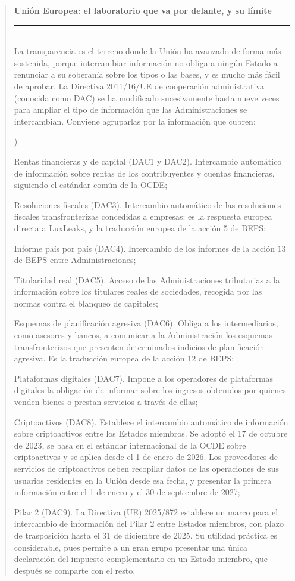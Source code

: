 \documentclass[10pt,a4paper]{article}
\newcounter{alphaitem}
\newenvironment{la}
      {\begin{list}{\alph{alphaitem})}{%
          \usecounter{alphaitem}%
          \setlength{\leftmargin}{1cm}%
          \setlength{\parskip}{3pt}%
          \setlength{\itemsep}{0pt}%
          \setlength{\parsep}{0pt}%
      }}
      {\end{list}}
\newenvironment{specialblock}[1]{%
      \begin{quote} %
      \small %
      \noindent\textbf{#1}\\[-0.3em] %
      \rule{\linewidth}{0.4pt}\\[0.6em]}{
      \end{quote}}
\begin{document}
\begin{specialblock}{\textbf{Unión Europea}: el laboratorio que va por delante, y su límite}
    La transparencia es el terreno donde la Unión ha avanzado de forma más sostenida, porque intercambiar información no obliga a ningún Estado a renunciar a su soberanía sobre los tipos o las bases, y es mucho más fácil de aprobar. La Directiva 2011/16/UE de cooperación administrativa (conocida como DAC) se ha modificado sucesivamente hasta nueve veces para ampliar el tipo de información que las Administraciones se intercambian. Conviene agruparlas por la información que cubren:
    \begin{la}
        \item Rentas financieras y de capital (DAC1 y DAC2). Intercambio automático de información sobre rentas de los contribuyentes y cuentas financieras, siguiendo el estándar común de la OCDE;
        \item Resoluciones fiscales (DAC3). Intercambio automático de las resoluciones fiscales transfronterizas concedidas a empresas: es la respuesta europea directa a LuxLeaks, y la traducción europea de la acción 5 de BEPS;
        \item Informe país por país (DAC4). Intercambio de los informes de la acción $13$ de BEPS entre Administraciones;
        \item Titularidad real (DAC5). Acceso de las Administraciones tributarias a la información sobre los titulares reales de sociedades, recogida por las normas contra el blanqueo de capitales;
        \item Esquemas de planificación agresiva (DAC6). Obliga a los intermediarios, como asesores y bancos, a comunicar a la Administración los esquemas transfronterizos que presenten determinados indicios de planificación agresiva. Es la traducción europea de la acción 12 de BEPS;
        \item Plataformas digitales (DAC7). Impone a los operadores de plataformas digitales la obligación de informar sobre los ingresos obtenidos por quienes venden bienes o prestan servicios a través de ellas;
        \item Criptoactivos (DAC8). Establece el intercambio automático de información sobre criptoactivos entre los Estados miembros. Se adoptó el 17 de octubre de 2023, se basa en el estándar internacional de la OCDE sobre criptoactivos y se aplica desde el 1 de enero de 2026. Los proveedores de servicios de criptoactivos deben recopilar datos de las operaciones de sus usuarios residentes en la Unión desde esa fecha, y presentar la primera información entre el 1 de enero y el 30 de septiembre de 2027;
        \item Pilar 2 (DAC9). La Directiva (UE) 2025/872 establece un marco para el intercambio de información del Pilar 2 entre Estados miembros, con plazo de trasposición hasta el 31 de diciembre de 2025. Su utilidad práctica es considerable, pues permite a un gran grupo presentar una única declaración del impuesto complementario en un Estado miembro, que después se comparte con el resto.
    \end{la}
    

\end{specialblock}
\end{document}
